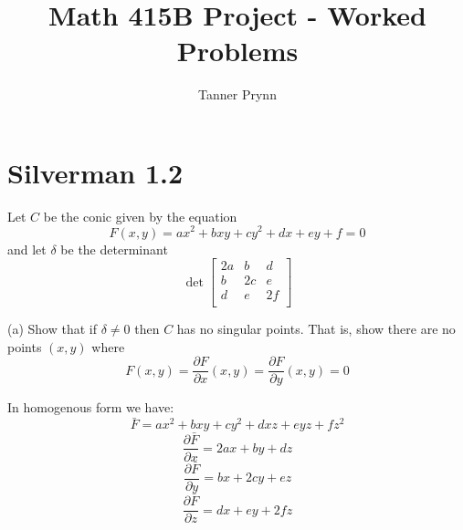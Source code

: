 \documentclass{article}
\begin{document}
\author{Tanner Prynn}
\title{Math 415B Project - Worked Problems}
\maketitle




\section{Silverman 1.2}
Let $C$ be the conic given by the equation
$$F(x,y) = ax^2 + bxy + cy^2 + dx + ey + f = 0$$
and let $\delta$ be the determinant
$$\det \begin{bmatrix}
2a & b & d \\
b & 2c & e \\
d & e & 2f \\
\end{bmatrix}$$

(a) Show that if $\delta \neq 0$ then $C$ has no singular points. That is, show there are no points $(x,y)$ where
$$F(x,y) = \frac{\partial F}{\partial x}(x,y) = \frac{\partial F}{\partial y}(x,y) = 0$$

In homogenous form we have:
$$\bar F = ax^2 + bxy + cy^2 + dxz + eyz + fz^2$$
$$\frac{\partial \bar F}{\partial x} = 2ax + by + dz$$
$$\frac{\partial \bar F}{\partial y} = bx + 2cy + ez$$
$$\frac{\partial \bar F}{\partial z} = dx + ey + 2fz$$
\end{document}
